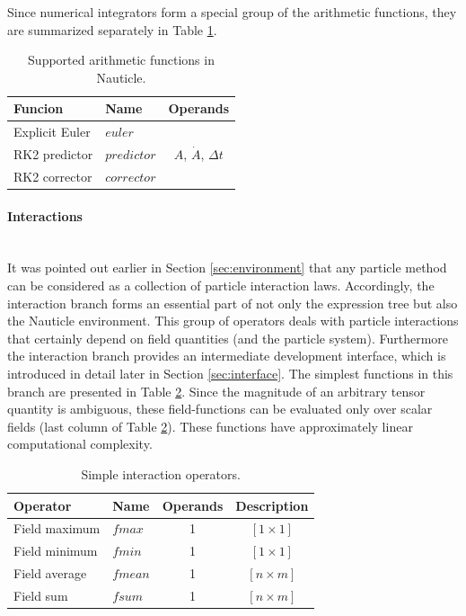 \documentclass[a4paper,12pt,openany]{book}
\newcommand{\myparagraph}[1]{\paragraph{#1}\mbox{}\\}
\theoremstyle{break}
\begin{document}
Since numerical integrators form a special group of the arithmetic functions, they are summarized separately in Table \ref{tbl:arfc_int}. 
\begin{table} [H]
\begin{center}
\caption{Supported arithmetic functions in Nauticle.}\label{tbl:arfc_int}
\begin{tabular}{ l l c }
\toprule[1.5pt]
\bf Funcion & \bf Name & \bf Operands \\ 
\midrule
Explicit Euler & $euler$ & \multirow{3}{*}{$A$, $\dot A$, $\Delta t$}   \\
RK2 predictor & $predictor$ & \\
RK2 corrector & $corrector$ &  \\
\bottomrule[1.25pt]
\end{tabular}
\end{center}
\end{table}

\myparagraph{Interactions}
It was pointed out earlier in Section \ref{sec:environment} that any particle method can be considered as a collection of particle interaction laws. Accordingly, the interaction branch forms an essential part of not only the expression tree but also the Nauticle environment. This group of operators deals with particle interactions that certainly depend on field quantities (and the particle system). Furthermore the interaction branch provides an intermediate development interface, which is introduced in detail later in Section \ref{sec:interface}.
The simplest functions in this branch are presented in Table \ref{tbl:fsearch}. Since the magnitude of an arbitrary tensor quantity is ambiguous, these field-functions can be evaluated only over scalar fields (last column of Table \ref{tbl:fsearch}). These functions have approximately linear computational complexity.
\begin{table}[H]
\begin{center}
\caption{Simple interaction operators.}\label{tbl:fsearch}
\begin{tabular}{ l l c c }
\toprule[1.5pt]
\bf Operator & \bf Name & \bf Operands & \bf Description\\
\midrule
Field maximum & $fmax$ & 1 & $[1 \times 1]$\\ 
Field minimum & $fmin$ & 1 & $[1 \times 1]$\\ 
Field average & $fmean$ & 1 & $[n \times m]$\\
Field sum & $fsum$ & 1 & $[n \times m]$\\
\bottomrule[1.25pt]
\end{tabular}
\end{center}
\end{table}
\end{document}
